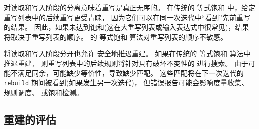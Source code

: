\egg 对读取和写入阶段的分离意味着重写是真正无序的。
在传统的 等式饱和 中，给定重写列表中的后续重写更受青睐，
  因为它们可以在同一次迭代中“看到”先前重写的结果。
因此，如果未达到饱和(这在大重写列表或输入表达式中很常见)，结果将取决于重写列表的顺序。
\egg 的 等式饱和 算法对重写列表的顺序不敏感。

将读取和写入阶段分开也允许 \egg 安全地推迟重建。
如果在传统的 等式饱和 算法中推迟重建，
  则重写列表中的后续规则将针对具有破坏不变性的 \egraph 进行搜索。
由于可能不满足同余，可能缺少等价性，导致缺少匹配。
这些匹配将在下一次迭代的 \texttt{rebuild} 期间被看到(如果发生另一次迭代)，
  但错误报告可能会影响度量收集、规则调度、\footnotemark{} 或饱和检测。

\subsection{重建的评估}
\label{sec:rebuild-eval}

